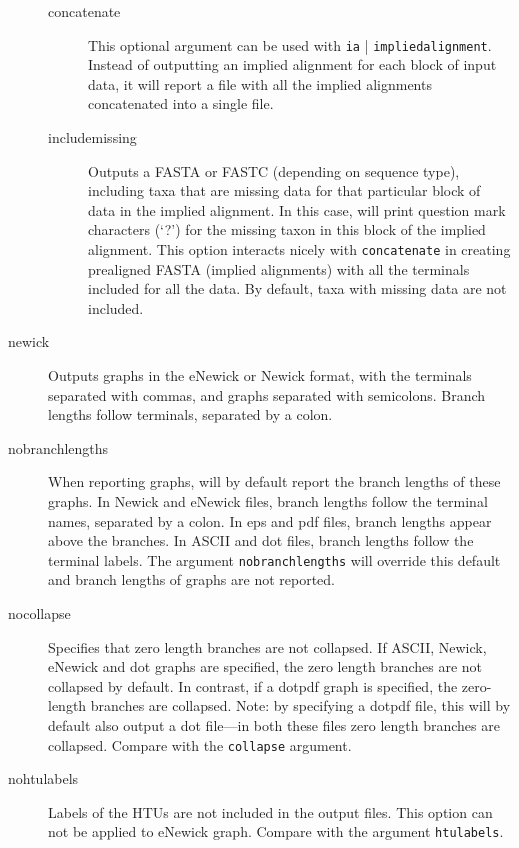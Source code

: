 \begin{description}
		\begin{description}
			\item[concatenate] This optional argument can be used with \texttt{ia}
			| \texttt{impliedalignment}. Instead of outputting an implied alignment 
			for each block of input data, it will report a file with all the implied 
			alignments concatenated into a single file.
			
			\item[includemissing] Outputs a FASTA or FASTC (depending on sequence type), 
			including taxa that are missing data for that particular block of data in the implied 
			alignment.
			In this case, \phyg will print question mark characters (`?') for the missing taxon in 
			this block of the implied alignment. This option interacts nicely with 
			\texttt{concatenate} in creating prealigned FASTA (implied alignments) 
			with all the terminals included for all the data. By default, taxa with 
			missing data are not included.
			
		\end{description}
				
		\item[newick] Outputs graphs in the eNewick or Newick format, with the terminals
		separated with commas, and graphs separated with semicolons. Branch
		lengths follow terminals, separated by a colon.
		
		\item[nobranchlengths] When reporting graphs, \phyg will by default 
		report the branch lengths of these graphs. In Newick and eNewick files, 
		branch lengths follow the terminal names, separated by a colon. In eps 
		and pdf files, branch lengths appear above the branches. In ASCII and 
		dot files, branch lengths follow the terminal labels. The argument
		\texttt{nobranchlengths} will override this default and branch lengths 
		of graphs are not reported.
		
		\item[nocollapse] Specifies that zero length branches are not collapsed.
		If ASCII, Newick, eNewick and dot graphs are specified, the zero length 
		branches are not collapsed by default. In contrast, if a dotpdf graph is 
		specified, the zero-length branches are collapsed. Note: by specifying 
		a dotpdf file, this will by default also output a dot file---in both these files 
		zero length branches are collapsed. Compare with the \texttt{collapse} 
		argument. 
				
		\item[nohtulabels] Labels of the HTUs are not included in the output files. 
		This option can not be applied to eNewick graph. Compare with the argument 
		\texttt{htulabels}.
		

\end{description}
